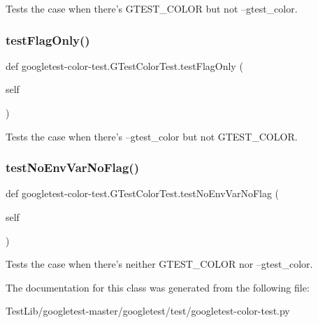 \begin{DoxyVerb}Tests the case when there's GTEST_COLOR but not --gtest_color.\end{DoxyVerb}
 \mbox{\label{classgoogletest-color-test_1_1GTestColorTest_ade41e99b5486c9d947d9b817210174f6}} 
\subsubsection{\texorpdfstring{test\+Flag\+Only()}{testFlagOnly()}}
{\footnotesize\ttfamily def googletest-\/color-\/test.\+G\+Test\+Color\+Test.\+test\+Flag\+Only (\begin{DoxyParamCaption}\item[{}]{self }\end{DoxyParamCaption})}

\begin{DoxyVerb}Tests the case when there's --gtest_color but not GTEST_COLOR.\end{DoxyVerb}
 \mbox{\label{classgoogletest-color-test_1_1GTestColorTest_ae36014618c6afc19fa6d77babf8faa88}} 
\subsubsection{\texorpdfstring{test\+No\+Env\+Var\+No\+Flag()}{testNoEnvVarNoFlag()}}
{\footnotesize\ttfamily def googletest-\/color-\/test.\+G\+Test\+Color\+Test.\+test\+No\+Env\+Var\+No\+Flag (\begin{DoxyParamCaption}\item[{}]{self }\end{DoxyParamCaption})}

\begin{DoxyVerb}Tests the case when there's neither GTEST_COLOR nor --gtest_color.\end{DoxyVerb}
 

The documentation for this class was generated from the following file\+:\begin{DoxyCompactItemize}
\item 
Test\+Lib/googletest-\/master/googletest/test/googletest-\/color-\/test.\+py\end{DoxyCompactItemize}
